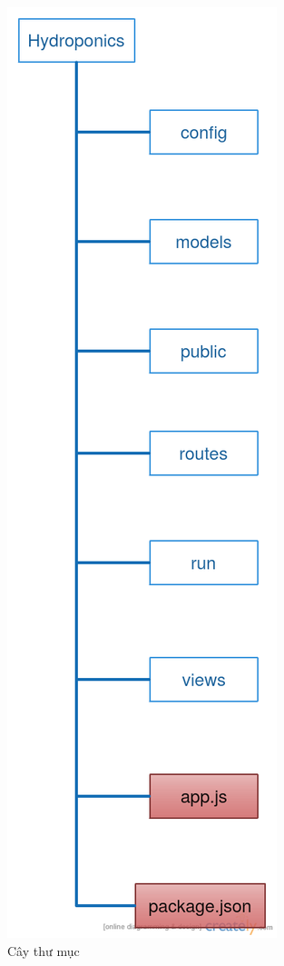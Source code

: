 \documentclass[a4paper,12pt,oneside]{article}
\begin{document}
\begin{center}
\begin{figure}[htp]
\begin{center}
\includegraphics[scale=.5]{hinh/folder.png}
\end{center}
\caption{Cây thư mục}
\label{refhinh1}
\end{figure}
\end{center}
\end{document}
